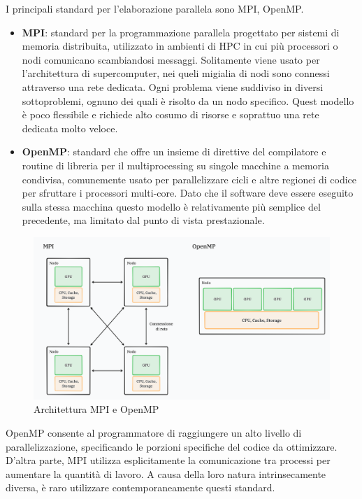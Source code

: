 I principali standard per l'elaborazione parallela sono MPI, OpenMP.


\begin{itemize}
    \item \textbf{MPI}: standard per la programmazione parallela progettato per sistemi di memoria distribuita, utilizzato in ambienti di HPC in cui più processori o nodi comunicano scambiandosi messaggi. Solitamente viene usato per l'architettura di supercomputer, nei queli migialia di nodi sono connessi attraverso una rete dedicata. Ogni problema viene suddiviso in diversi sottoproblemi, ognuno dei quali è risolto da un nodo specifico. Quest modello è poco flessibile e richiede alto cosumo di risorse e soprattuo una rete dedicata molto veloce.
    \item \textbf{OpenMP}: standard che offre un insieme di direttive del compilatore e routine di libreria per il multiprocessing su singole macchine a memoria condivisa, comunemente usato per parallelizzare cicli e altre regionei di codice per sfruttare i processori multi-core. Dato che il software deve essere eseguito sulla stessa macchina questo modello è relativamente più semplice del precedente, ma limitato dal punto di vista prestazionale.
\end{itemize}

\begin{figure}[ht]
    \centering
    \includegraphics[width=.9\linewidth]{images/chapter2/mpi_openmp.png}
    \caption{Architettura MPI e OpenMP}
    \label{fig:mpi_openmp}
\end{figure}

OpenMP consente al programmatore di raggiungere un alto livello di parallelizzazione, specificando le porzioni specifiche del codice da ottimizzare. D'altra parte, MPI utilizza esplicitamente la comunicazione tra processi per aumentare la quantità di lavoro. A causa della loro natura intrinsecamente diversa, è raro utilizzare contemporaneamente questi standard.

